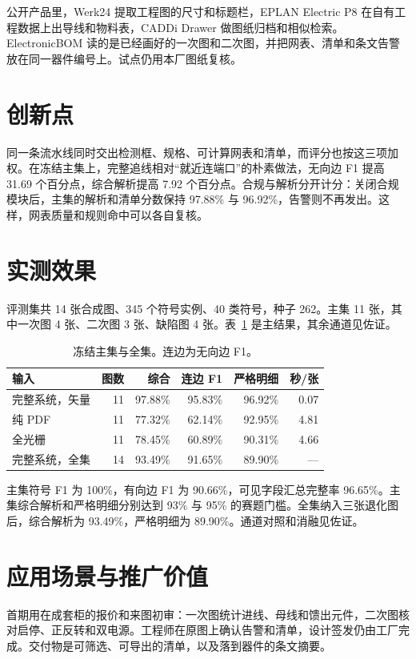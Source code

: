 公开产品里，Werk24 提取工程图的尺寸和标题栏，EPLAN Electric P8 在自有工程数据上出导线和物料表，CADDi Drawer 做图纸归档和相似检索。ElectronicBOM 读的是已经画好的一次图和二次图，并把网表、清单和条文告警放在同一器件编号上。试点仍用本厂图纸复核。

\section{创新点}
同一条流水线同时交出检测框、规格、可计算网表和清单，而评分也按这三项加权。在冻结主集上，完整追线相对“就近连端口”的朴素做法，无向边 F1 提高 31.69 个百分点，综合解析提高 7.92 个百分点。合规与解析分开计分：关闭合规模块后，主集的解析和清单分数保持 97.88\% 与 96.92\%，告警则不再发出。这样，网表质量和规则命中可以各自复核。

\section{实测效果}
评测集共 14 张合成图、345 个符号实例、40 类符号，种子 262。主集 11 张，其中一次图 4 张、二次图 3 张、缺陷图 4 张。表~\ref{tab:main} 是主结果，其余通道见佐证。

\begin{table}[ht]
\centering
\caption{冻结主集与全集。连边为无向边 F1。}
\label{tab:main}
\footnotesize
\setlength{\tabcolsep}{4pt}
\begin{tabular}{lrrrrr}
\toprule
输入 & 图数 & 综合 & 连边 F1 & 严格明细 & 秒/张 \\
\midrule
完整系统，矢量 & 11 & 97.88\% & 95.83\% & 96.92\% & 0.07 \\
纯 PDF & 11 & 77.32\% & 62.14\% & 92.95\% & 4.81 \\
全光栅 & 11 & 78.45\% & 60.89\% & 90.31\% & 4.66 \\
完整系统，全集 & 14 & 93.49\% & 91.65\% & 89.90\% & --- \\
\bottomrule
\end{tabular}
\end{table}

主集符号 F1 为 100\%，有向边 F1 为 90.66\%，可见字段汇总完整率 96.65\%。主集综合解析和严格明细分别达到 93\% 与 95\% 的赛题门槛。全集纳入三张退化图后，综合解析为 93.49\%，严格明细为 89.90\%。通道对照和消融见佐证。

\section{应用场景与推广价值}
\label{sec:value}
首期用在成套柜的报价和来图初审：一次图统计进线、母线和馈出元件，二次图核对启停、正反转和双电源。工程师在原图上确认告警和清单，设计签发仍由工厂完成。交付物是可筛选、可导出的清单，以及落到器件的条文摘要。

